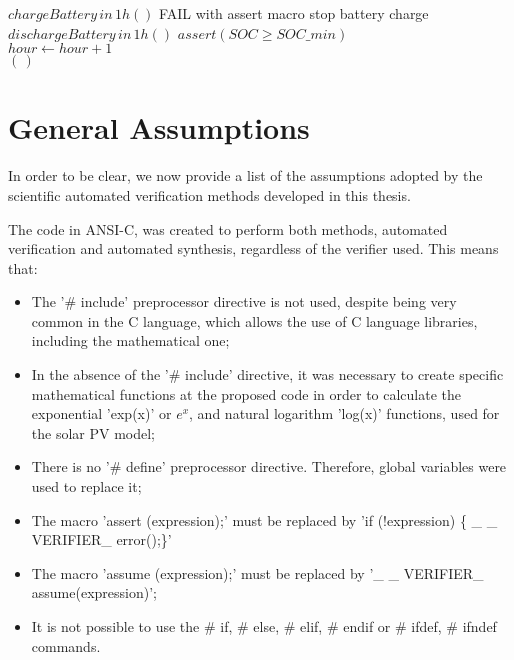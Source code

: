 \begin{algorithm}
\begin{algorithmic}[1]
\begin{scriptsize}
      \STATE $chargeBattery \, in \, 1h()$ 
      \STATE FAIL with assert macro 
      \STATE stop battery charge 
      \STATE $dischargeBattery \, in \, 1h()$ 
    \ENDIF
    \STATE $assert (SOC \geq SOC \_ min)$ \\
    \STATE $hour \leftarrow hour+1$ \\
   \ENDFOR
  \ENDFOR
 \RETURN $(\,)$ 
  \end{scriptsize}
 \end{algorithmic} 
 \label{alg:verification-algorithm}
 \end{algorithm}

%

\section{General Assumptions}
\label{sec:assumptions}

In order to be clear, we now provide a list of the assumptions adopted by the scientific automated verification methods developed in this thesis.

The code in ANSI-C, was created to perform both methods, automated verification and automated synthesis, regardless of the verifier used. This means that: 

\begin{itemize}
\item The '\# include' preprocessor directive is not used, despite being very common in the C language, which allows the use of C language libraries, including the mathematical one;
\item In the absence of the '\# include' directive, it was necessary to create specific mathematical functions at the proposed code in order to calculate the exponential 'exp(x)' or $e^{x}$, and natural logarithm 'log(x)' functions, used for the solar PV model;
\item There is no '\# define' preprocessor directive. Therefore, global variables were used to replace it;
\item The macro 'assert (expression);' must be replaced by 'if (!expression) \{ \_ \_ VERIFIER\_ error();\}'
\item The macro 'assume (expression);' must be replaced by '\_ \_ VERIFIER\_ assume(expression)';
\item It is not possible to use the \# if, \# else, \# elif, \# endif or \# ifdef, \# ifndef commands.
\end{itemize}

